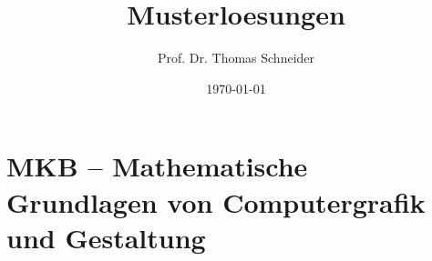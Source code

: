 \documentclass[a4paper,
               fontsize=11pt
               headsepline,
               headsepline,%
               footsepline,%
               footinclude=false,
               DIV=11,
               parskip=half,
               xcolor=dvipsnames
               BCOR=8mm,
               german,
               numbers=noenddot,
               bibliography=totoc]{scrbook}
\title{Musterloesungen }
\author{Prof. Dr. Thomas Schneider }
\date{\today}
\begin{document}

\frontmatter
\tableofcontents
\mainmatter
{}
\part{MKB -- Mathematische Grundlagen von Computergrafik und Gestaltung}

\backmatter
\nocite{*}
\end{document}

